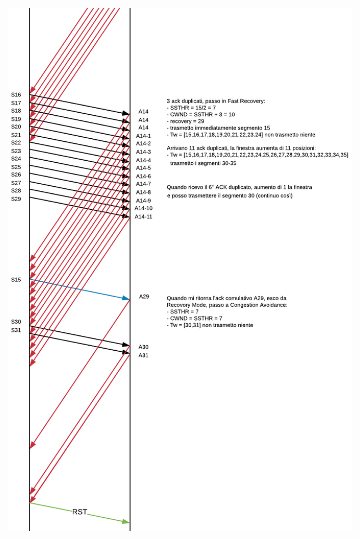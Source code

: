 \documentclass[10pt,a4paper]{article}
\begin{document}
\begin{enumerate}
\begin{figure}[H]
\begin{subfigure}[b]{9cm}
				\end{subfigure}
				\begin{subfigure}[b]{9cm}
				  \includegraphics[width=\textwidth]{Esame812019_Conperdite2}
				\end{subfigure}
			  \end{figure}
	\end{enumerate}
\end{document}
